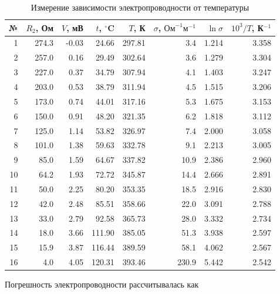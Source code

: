 \documentclass[a4paper,12pt]{article}
\begin{document}
\begin{table}[h]
    \centering
    \small
    \caption{Измерение зависимости электропроводности от температуры}
    \label{tab:data}
    \begin{tabular}{|r|r|r|r|r|r|r|r|}
        \hline
        № & $R_2$, Ом & $V$, мВ & $t$, $^\circ$C & $T$, К & $\sigma$, $\text{Ом}^{-1}\text{м}^{-1}$ & $\ln\sigma$ & $10^3/T$, К$^{-1}$ \\
        \hline
         1 &  274.3 & -0.03 &  24.66 & 297.81 &       3.4 &  1.214 &  3.358 \\
         2 &  257.0 &  0.16 &  29.49 & 302.64 &       3.6 &  1.279 &  3.304 \\
         3 &  227.0 &  0.37 &  34.79 & 307.94 &       4.1 &  1.403 &  3.247 \\
         4 &  203.0 &  0.53 &  38.79 & 311.94 &       4.5 &  1.515 &  3.206 \\
         5 &  173.0 &  0.74 &  44.01 & 317.16 &       5.3 &  1.675 &  3.153 \\
         6 &  150.0 &  0.91 &  48.20 & 321.35 &       6.2 &  1.818 &  3.112 \\
         7 &  125.0 &  1.14 &  53.82 & 326.97 &       7.4 &  2.000 &  3.058 \\
         8 &  101.0 &  1.38 &  59.63 & 332.78 &       9.1 &  2.213 &  3.005 \\
         9 &   85.0 &  1.59 &  64.67 & 337.82 &      10.9 &  2.386 &  2.960 \\
        10 &   64.2 &  1.93 &  72.72 & 345.87 &      14.4 &  2.666 &  2.891 \\
        11 &   50.0 &  2.25 &  80.20 & 353.35 &      18.5 &  2.916 &  2.830 \\
        12 &   42.0 &  2.48 &  85.51 & 358.66 &      22.0 &  3.091 &  2.788 \\
        13 &   33.0 &  2.79 &  92.58 & 365.73 &      28.0 &  3.332 &  2.734 \\
        14 &   18.0 &  3.66 & 111.90 & 385.05 &      51.3 &  3.938 &  2.597 \\
        15 &   15.9 &  3.87 & 116.44 & 389.59 &      58.1 &  4.062 &  2.567 \\
        16 &    4.0 &  4.05 & 120.31 & 393.46 &     230.9 &  5.442 &  2.542 \\
        \hline
    \end{tabular}
\end{table}

Погрешность электропроводности рассчитывалась как
\end{document}
